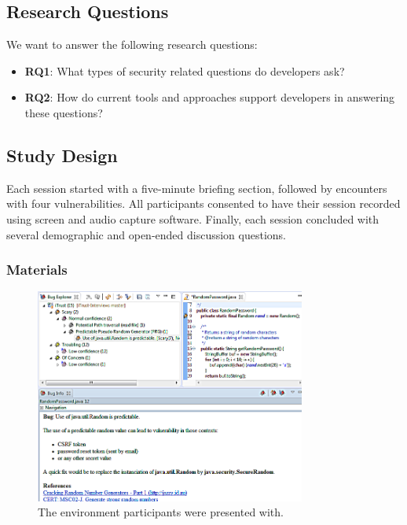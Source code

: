 \documentclass[conference]{IEEEtran}
\begin{document}
\subsection{Research Questions}
\label{rqs}
We want to answer the following research questions:
\begin{itemize}
\item \textbf{RQ1}: What types of security related questions do developers ask?
\item \textbf{RQ2}: How do current tools and approaches support developers in answering these questions?
\end{itemize}


\subsection{Study Design}
\label{studyDesign}
Each session started with a five-minute briefing section, followed by encounters with four vulnerabilities.
All participants consented to have their session recorded using screen and audio capture software.
Finally, each session concluded with several demographic and open-ended discussion questions.


\subsubsection{Materials}
\begin{figure}
\centering
\includegraphics[width=3.5in]{Images/environment.png}
\caption{The environment participants were presented with.}
\label{fig:environment} 
\end{figure}
\end{document}

